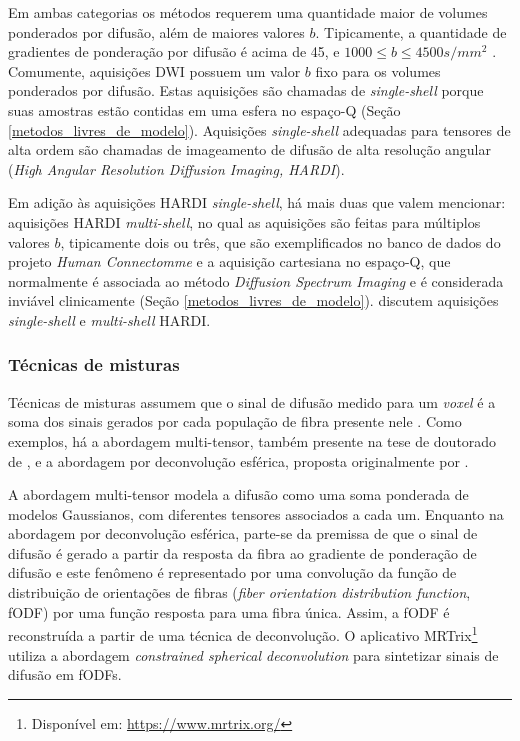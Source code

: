 \documentclass[
    12pt,                %
    oneside,            %
    a4paper,            %
    english,            %
    french,                %
    spanish,            %
    brazil                %
    ]{abntex2}
\begin{document}
Em ambas categorias os métodos requerem uma quantidade maior de volumes ponderados por difusão, além de maiores valores $b$. Tipicamente, a quantidade de gradientes de ponderação por difusão é acima de 45, e $1000 \leq b \leq 4500s/mm^2$ \cite{descoteaux2015}. Comumente, aquisições DWI possuem um valor $b$ fixo para os volumes ponderados por difusão. Estas aquisições são chamadas de \textit{single-shell} porque suas amostras estão contidas em uma esfera no espaço-Q (Seção \ref{metodos_livres_de_modelo}). Aquisições \textit{single-shell} adequadas para tensores de alta ordem são chamadas de imageamento de difusão de alta resolução angular (\textit{High Angular Resolution Diffusion Imaging, HARDI}).

Em adição às aquisições HARDI \textit{single-shell}, há mais duas que valem mencionar: aquisições HARDI \textit{multi-shell}, no qual as aquisições são feitas para múltiplos valores $b$, tipicamente dois ou três, que são exemplificados no banco de dados do projeto \textit{Human Connectomme} \cite{essen2012} e a aquisição cartesiana no espaço-Q, que normalmente é associada ao método \textit{Diffusion Spectrum Imaging} e 
é considerada inviável clinicamente (Seção \ref{metodos_livres_de_modelo}).  discutem aquisições \textit{single-shell} e \textit{multi-shell} HARDI.


\subsubsection{Técnicas de misturas}

Técnicas de misturas assumem que o sinal de difusão medido para um \textit{voxel} é a soma dos sinais gerados por cada população de fibra presente nele \cite{tournier2011}. Como exemplos, há a abordagem multi-tensor, também presente na tese de doutorado de , e a abordagem por deconvolução esférica, proposta originalmente por .

A abordagem multi-tensor modela a difusão como uma soma ponderada de modelos Gaussianos, com diferentes tensores associados a cada um. Enquanto na abordagem por deconvolução esférica, parte-se da premissa de que o sinal de difusão é gerado a partir da resposta da fibra ao gradiente de ponderação de difusão e este fenômeno é representado por uma convolução da função de distribuição de orientações de fibras (\textit{fiber orientation distribution function}, fODF) por uma função resposta para uma fibra única. Assim, a fODF é reconstruída a partir de uma técnica de deconvolução. O aplicativo MRTrix\footnote{Disponível em: \url{https://www.mrtrix.org/}} utiliza a abordagem \textit{constrained spherical deconvolution} \cite{tournier2007} para sintetizar sinais de difusão em fODFs.
\end{document}
